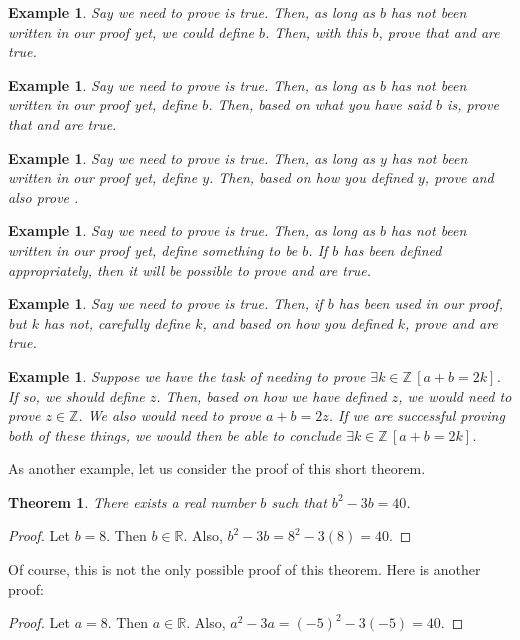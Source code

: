\documentclass{book}
\newcounter{ekcounter}%
\theoremstyle{ekimcustom}
\newtheorem{theorem}[ekcounter]{Theorem}
\newtheorem{example}[ekcounter]{Example}
\begin{document}
\begin{example}
Say we need to prove  is true. Then, as long as $b$ has not been written in our proof yet, we could define $b$. Then, with this $b$, prove that  and  are true.
\end{example}
\begin{example}
Say we need to prove  is true. Then, as long as $b$ has not been written in our proof yet, define $b$. Then, based on what you have said $b$ is, prove that  and  are true.
\end{example}
\begin{example}
Say we need to prove  is true. Then, as long as $y$ has not been written in our proof yet, define $y$. Then, based on how you defined $y$, prove  and also prove .
\end{example}
\begin{example}
Say we need to prove  is true. Then, as long as $b$ has not been written in our proof yet, define something to be $b$. If $b$ has been defined appropriately, then it will be possible to prove  and  are true.
\end{example}
\begin{example}
Say we need to prove  is true. Then, if $b$ has been used in our proof, but $k$ has not, carefully define $k$, and based on how you defined $k$, prove  and  are true.
\end{example}


\begin{example}\label{example:prove-existence-revisit-first-proof}
Suppose we have the task of needing to prove $\exists k \in \mathbb{Z}\,[a+b=2k]$. If so, we should define $z$. Then, based on how we have defined $z$, we would need to prove $z \in \mathbb{Z}$. We also would need to prove $a+b=2z$. If we are successful proving both of these things, we would then be able to conclude $\exists k \in \mathbb{Z}\,[a+b=2k]$.
\end{example}

As another example, let us consider the proof of this short theorem.
\begin{theorem}\label{theorem:existence-not-uniqueness}
There exists a real number $b$ such that $b^2-3b=40$.
\end{theorem}
\begin{proof}
Let $b = 8$. Then $b \in \mathbb{R}$. Also, $b^2-3b=8^2-3(8)=40$.
\end{proof}
Of course, this is not the only possible proof of this theorem. Here is another proof:
\begin{proof}
Let $a = 8$. Then $a \in \mathbb{R}$. Also, $a^2-3a=(-5)^2-3(-5)=40$.
\end{proof}
\end{document}
